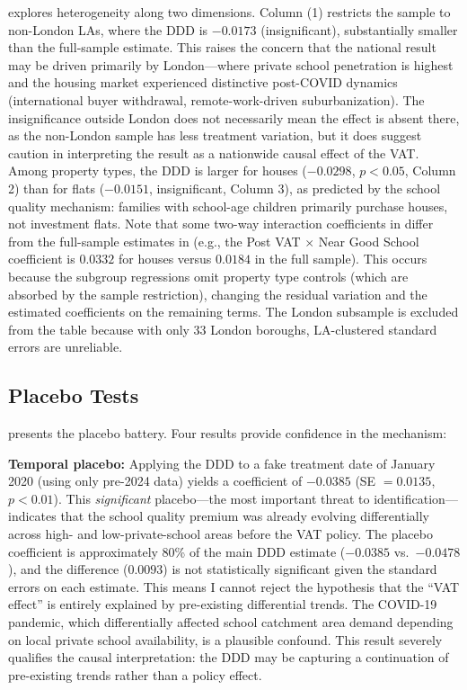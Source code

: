 \documentclass[12pt]{article}
\begin{document}
 explores heterogeneity along two dimensions. Column (1) restricts the sample to non-London LAs, where the DDD is $-0.0173$ (insignificant), substantially smaller than the full-sample estimate. This raises the concern that the national result may be driven primarily by London---where private school penetration is highest and the housing market experienced distinctive post-COVID dynamics (international buyer withdrawal, remote-work-driven suburbanization). The insignificance outside London does not necessarily mean the effect is absent there, as the non-London sample has less treatment variation, but it does suggest caution in interpreting the result as a nationwide causal effect of the VAT. Among property types, the DDD is larger for houses ($-0.0298$, $p < 0.05$, Column 2) than for flats ($-0.0151$, insignificant, Column 3), as predicted by the school quality mechanism: families with school-age children primarily purchase houses, not investment flats. Note that some two-way interaction coefficients in  differ from the full-sample estimates in  (e.g., the Post VAT $\times$ Near Good School coefficient is $0.0332$ for houses versus $0.0184$ in the full sample). This occurs because the subgroup regressions omit property type controls (which are absorbed by the sample restriction), changing the residual variation and the estimated coefficients on the remaining terms. The London subsample is excluded from the table because with only 33 London boroughs, LA-clustered standard errors are unreliable.

\subsection{Placebo Tests}



 presents the placebo battery. Four results provide confidence in the mechanism:

\textbf{Temporal placebo:} Applying the DDD to a fake treatment date of January 2020 (using only pre-2024 data) yields a coefficient of $-0.0385$ (SE $= 0.0135$, $p < 0.01$). This \textit{significant} placebo---the most important threat to identification---indicates that the school quality premium was already evolving differentially across high- and low-private-school areas before the VAT policy. The placebo coefficient is approximately 80\% of the main DDD estimate ($-0.0385$ vs.\ $-0.0478$), and the difference ($0.0093$) is not statistically significant given the standard errors on each estimate. This means I cannot reject the hypothesis that the ``VAT effect'' is entirely explained by pre-existing differential trends. The COVID-19 pandemic, which differentially affected school catchment area demand depending on local private school availability, is a plausible confound. This result severely qualifies the causal interpretation: the DDD may be capturing a continuation of pre-existing trends rather than a policy effect.
\end{document}
